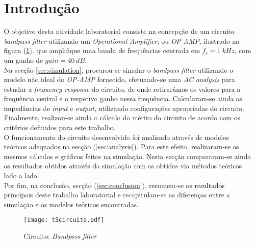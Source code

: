 \clearpage

\section{Introdução}
\label{sec:introduction}

O objetivo desta atividade laboratorial consiste na concepção de um circuito \emph{bandpass filter} utilizando 
um \emph{Operational Amplifier}, ou \emph{OP-AMP}, ilustrado na figura (\ref{fig:Circuito}), que amplifique uma banda
de frequências centrada em $f_c = 1 \: kHz$, com um ganho de $gain = 40 \: dB$.
\\
Na secção \ref{sec:simulation}, procurou-se simular o \emph{bandpass filter} utilizando o modelo não ideal do
\emph{OP-AMP} fornecido, efetuando-se uma \emph{AC analysis} para estudar a \emph{frequency response} do circuito,
de onde retirarámos os valores para a frequência central e o respetivo ganho nessa frequência.
Calcularam-se ainda as impedâncias de \emph{input} e \emph{output}, utilizando configurações apropriadas do circuito.
Finalmente, realizou-se ainda o cálculo do mérito do circuito de acordo com os critérios definidos para este trabalho.
\\
O funcionamento do circuito desenvolvido foi analisado através de modelos teóricos adequados na secção (\ref{sec:analysis}).
Para este efeito, realizaram-se os mesmos cálculos e gráficos feitos na simulação. Nesta secção compararam-se ainda os
resultados obtidos através da simulação com os obtidos via métodos teóricos lado a lado.
\\
Por fim, na conclusão, secção (\ref{sec:conclusion}), resumem-se os resultados principais deste trabalho laboratorial
e recapitulam-se as diferenças entre a simulação e os modelos teóricos encontradas.

\begin{figure}[H] \centering
    \texttt{[image: t5circuito.pdf]}
    \caption{Circuito: \emph{Bandpass filter}}
    \label{fig:Circuito}
\end{figure}